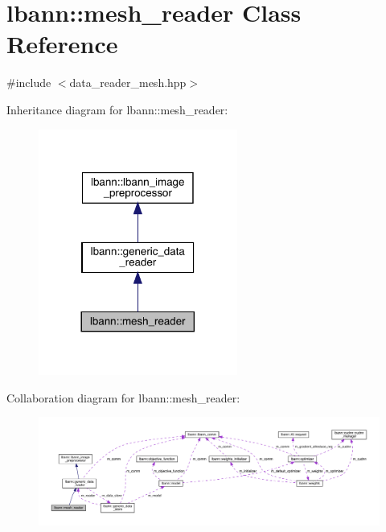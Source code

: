 \hypertarget{classlbann_1_1mesh__reader}{}\section{lbann\+:\+:mesh\+\_\+reader Class Reference}
\label{classlbann_1_1mesh__reader}


{\ttfamily \#include $<$data\+\_\+reader\+\_\+mesh.\+hpp$>$}



Inheritance diagram for lbann\+:\+:mesh\+\_\+reader\+:\nopagebreak
\begin{figure}[H]
\begin{center}
\leavevmode
\includegraphics[width=185pt]{classlbann_1_1mesh__reader__inherit__graph}
\end{center}
\end{figure}


Collaboration diagram for lbann\+:\+:mesh\+\_\+reader\+:\nopagebreak
\begin{figure}[H]
\begin{center}
\leavevmode
\includegraphics[width=350pt]{classlbann_1_1mesh__reader__coll__graph}
\end{center}
\end{figure}
